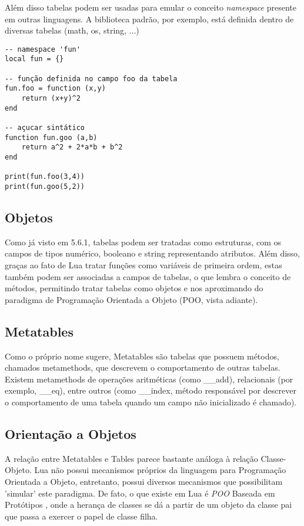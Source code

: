 \documentclass[a4paper,12pt]{abnt}
\begin{document}
Além disso tabelas podem ser usadas para emular o conceito \emph{namespace}
presente em outras linguagens. A biblioteca padrão, por exemplo, está definida
dentro de diversas tabelas (math, os, string, ...)

\begin{lstlisting}
-- namespace 'fun'
local fun = {}

-- função definida no campo foo da tabela
fun.foo = function (x,y)
    return (x+y)^2
end

-- açucar sintático
function fun.goo (a,b)
    return a^2 + 2*a*b + b^2
end

print(fun.foo(3,4))
print(fun.goo(5,2))
\end{lstlisting}

\subsection{Objetos}

Como já visto em 5.6.1, tabelas podem ser tratadas como estruturas, com os campos
de tipos numérico, booleano e string representando atributos.
Além disso, graças ao fato de Lua tratar funções como variáveis de primeira
ordem, estas também podem ser associadas a campos de tabelas, o que lembra o
conceito de métodos, permitindo tratar tabelas como objetos e nos aproximando
do paradigma de Programação Orientada a Objeto (POO, vista adiante).

\subsection{Metatables}

Como o próprio nome sugere, Metatables são tabelas que possuem métodos, chamados
metamethods, que descrevem o comportamento de outras tabelas.
Existem metamethods de operações aritméticas (como \_\_add), relacionais
(por exemplo, \_\_eq), entre outros (como \_\_index, método responsável por
descrever o comportamento de uma tabela quando um campo não inicializado é chamado).

\subsection{Orientação a Objetos}

A relação entre Metatables e Tables parece bastante análoga à relação Classe-Objeto.
Lua não possui mecanismos próprios da linguagem para Programação Orientada a Objeto,
entretanto, possui diversos mecanismos que possibilitam 'simular' este paradigma.
De fato, o que existe em Lua é \emph{POO} Baseada em Protótipos \cite{pbo} , onde a herança de
classes se dá a partir de um objeto da classe pai que passa a exercer o papel de classe filha.
\end{document}

